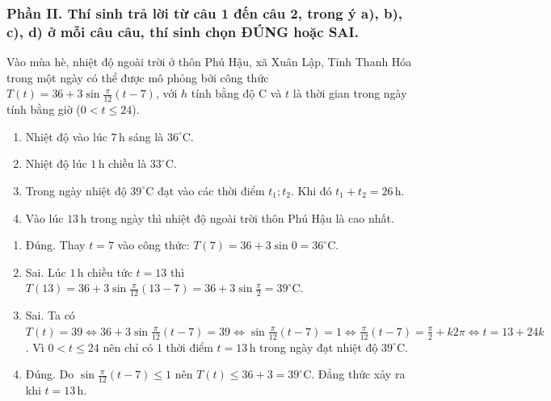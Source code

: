 \subsubsection*{Phần II. Thí sinh trả lời từ câu 1 đến câu 2, trong ý a), b), c), d) ở mỗi câu câu, thí sinh chọn ĐÚNG hoặc SAI.}
\setcounter{bt}{0}\setcounter{bt}{0}
\begin{baitap}
	Vào mùa hè, nhiệt độ ngoài trời ở thôn Phú Hậu, xã Xuân Lập, Tỉnh Thanh Hóa trong một ngày có thể được mô phỏng bởi công thức $T(t) = 36 + 3\sin\frac{\pi}{12}(t - 7)$, với $h$ tính bằng độ $\mathrm{C}$ và $t$ là thời gian trong ngày tính bằng giờ ($0 < t \le 24$).
	\begin{enumerate}
		\item Nhiệt độ vào lúc $7\,\mathrm{h}$ sáng là $36^\circ\mathrm{C}$.
		\item Nhiệt độ lúc $1\,\mathrm{h}$ chiều là $33^\circ\mathrm{C}$.
		\item Trong ngày nhiệt độ $39^\circ\mathrm{C}$ đạt vào các thời điểm $t_1; t_2$. Khi đó $t_1 + t_2 = 26\,\mathrm{h}$.
		\item Vào lúc $13\,\mathrm{h}$ trong ngày thì nhiệt độ ngoài trời thôn Phú Hậu là cao nhất.
	\end{enumerate}
	\begin{traloi}
		\begin{enumerate}
			\item  Đúng. Thay $t = 7$ vào công thức: $T(7) = 36 + 3\sin 0 = 36^\circ\mathrm{C}$.
			\item Sai. Lúc $1\,\mathrm{h}$ chiều tức $t = 13$ thì $T(13) = 36 + 3\sin\frac{\pi}{12}(13 - 7) = 36 + 3\sin\frac{\pi}{2} = 39^\circ\mathrm{C}$.
			\item Sai. Ta có $T(t) = 39 \Leftrightarrow 36 + 3\sin\frac{\pi}{12}(t - 7) = 39 \Leftrightarrow \sin\frac{\pi}{12}(t - 7) = 1 \Leftrightarrow \frac{\pi}{12}(t - 7) = \frac{\pi}{2} + k2\pi \Leftrightarrow t = 13 + 24k$.
		Vì $0 < t \le 24$ nên chỉ có $1$ thời điểm $t = 13\,\mathrm{h}$ trong ngày đạt nhiệt độ $39^\circ\mathrm{C}$.
			\item  Đúng. Do $\sin\frac{\pi}{12}(t - 7) \le 1$ nên $T(t) \le 36 + 3 = 39^\circ\mathrm{C}$. Đẳng thức xảy ra khi $t = 13\,\mathrm{h}$.
		\end{enumerate}
	\end{traloi}
\end{baitap}

